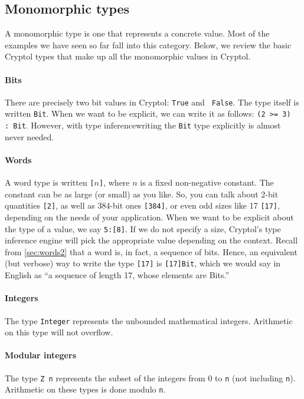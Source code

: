 \subsection{Monomorphic types}\indMonomorphism
\label{sec:monomorphic-types}

A monomorphic type is one that represents a concrete value. Most of
the examples we have seen so far fall into this category. Below, we
review the basic Cryptol types that make up all the monomorphic values
in Cryptol.

\paragraph*{Bits}\indTheBitType\indTrue\indFalse There are precisely
two bit values in Cryptol: {\tt True} and {\tt
  False}. The type itself is written {\tt Bit}. When we want to be
explicit, we can write it as follows: \texttt{(2 >= 3) :\ Bit}. However,
with type inference\indTypeInference writing the {\tt Bit} type
explicitly is almost never needed.

\paragraph*{Words}\indTheWordType\indTheBitType A word type is written
{\tt [}$n${\tt ]}, where $n$ is a fixed
non-negative constant. The constant can be as large (or small) as you
like.  So, you can talk about 2-bit quantities {\tt [2]}, as well as
384-bit ones {\tt [384]}, or even odd sizes like 17 {\tt [17]},
depending on the needs of your application. When we want to be
explicit about the type of a value, we say {\tt 5:[8]}. If we do not
specify a size, Cryptol's type inference engine will pick the
appropriate value depending on the context.\indTypeInference
Recall from \autoref{sec:words2} that a word is, in fact, a
sequence of bits.  Hence, an equivalent (but verbose) way to write the
type {\tt [17]} is {\tt [17]Bit}, which we would say in English as
``a sequence of length 17, whose elements are Bits.''

\paragraph*{Integers}\indTheIntegerType The type \texttt{Integer}
represents the unbounded mathematical integers. Arithmetic on this
type will not overflow.

\paragraph*{Modular integers} The type \texttt{Z n} represents
the subset of the integers from 0 to \texttt{n} (not including \texttt{n}).
Arithmetic on these types is done modulo \texttt{n}.

